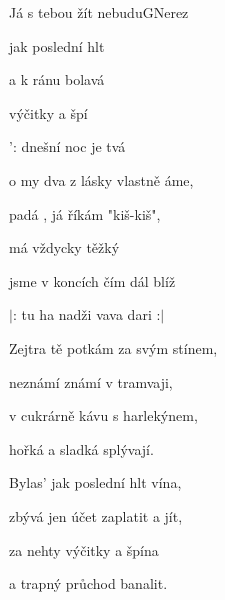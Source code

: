 \setcounter{page}{38}
\begin{song}{Já s tebou žít nebudu}{G}{Nerez}

\begin{SBVerse}

 jak poslední hlt 

 a k ránu bolavá

 výčitky a špí

': dnešní noc je tvá

\end{SBVerse}

\begin{SBChorus}

o my dva z lásky vlastně áme,

  padá , já říkám "kiš-kiš",

 má vždycky těžký 

 jsme v koncích čím dál blíž

$|$:  tu ha nadži vava  dari   :$|$
\end{SBChorus}

\begin{SBVerse}

Zejtra tě potkám za svým stínem,

neznámí známí v tramvaji,

v cukrárně kávu s harlekýnem,

hořká a sladká splývají.

\end{SBVerse}

\begin{SBChorus}

\end{SBChorus}

\begin{SBVerse}

Bylas' jak poslední hlt vína,

zbývá jen účet zaplatit a jít,

za nehty výčitky a špína

a trapný průchod banalit.

\end{SBVerse}

\begin{SBChorus}


\end{SBChorus}
\end{song}
